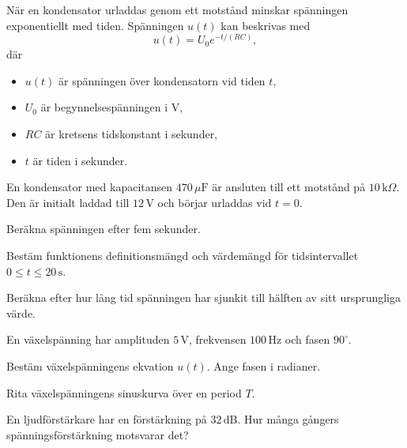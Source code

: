 När en kondensator urladdas genom ett motstånd minskar spänningen exponentiellt med tiden.
Spänningen $u(t)$ kan beskrivas med
\[
  u(t) = U_0 e^{-t/(RC)},
\]
där
\begin{itemize}
  \item $u(t)$ är spänningen över kondensatorn vid tiden $t$,
  \item $U_0$ är begynnelsespänningen i V,
  \item $RC$ är kretsens tidskonstant i sekunder,
  \item $t$ är tiden i sekunder.
\end{itemize}
En kondensator med kapacitansen $470\,\mu\text{F}$ är ansluten till ett motstånd på
$10\,\text{k}\Omega$. Den är initialt laddad till $12\,\text{V}$ och börjar urladdas vid $t = 0$.
\begin{parts}
  \item Beräkna spänningen efter fem sekunder.
  \item Bestäm funktionens definitionsmängd och värdemängd för tidsintervallet
    $0 \leq t \leq 20\,\text{s}$.
  \item Beräkna efter hur lång tid spänningen har sjunkit till hälften av sitt ursprungliga
    värde.
\end{parts}

En växelspänning har amplituden $5\,\text{V}$, frekvensen $100\,\text{Hz}$ och fasen
$90^{\circ}$.
\begin{parts}
  \item Bestäm växelspänningens ekvation $u(t)$. Ange fasen i radianer.
  \item Rita växelspänningens sinuskurva över en period $T$.
\end{parts}

En ljudförstärkare har en förstärkning på $32\,\text{dB}$. Hur många gångers
spänningsförstärkning motsvarar det?
